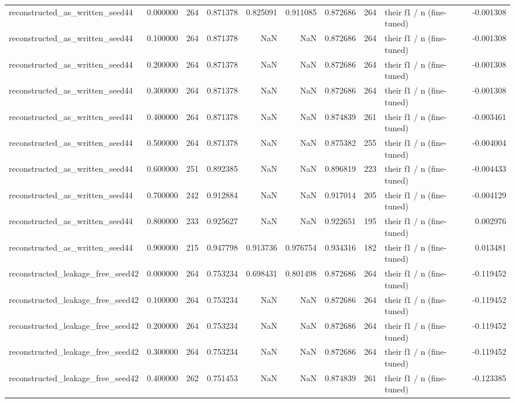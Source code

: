 \begin{tabular}{lrrrrrrrlr}
reconstructed_as_written_seed44 & 0.000000 & 264 & 0.871378 & 0.825091 & 0.911085 & 0.872686 & 264 & their f1 / n (fine-tuned) & -0.001308 \\
reconstructed_as_written_seed44 & 0.100000 & 264 & 0.871378 & NaN & NaN & 0.872686 & 264 & their f1 / n (fine-tuned) & -0.001308 \\
reconstructed_as_written_seed44 & 0.200000 & 264 & 0.871378 & NaN & NaN & 0.872686 & 264 & their f1 / n (fine-tuned) & -0.001308 \\
reconstructed_as_written_seed44 & 0.300000 & 264 & 0.871378 & NaN & NaN & 0.872686 & 264 & their f1 / n (fine-tuned) & -0.001308 \\
reconstructed_as_written_seed44 & 0.400000 & 264 & 0.871378 & NaN & NaN & 0.874839 & 261 & their f1 / n (fine-tuned) & -0.003461 \\
reconstructed_as_written_seed44 & 0.500000 & 264 & 0.871378 & NaN & NaN & 0.875382 & 255 & their f1 / n (fine-tuned) & -0.004004 \\
reconstructed_as_written_seed44 & 0.600000 & 251 & 0.892385 & NaN & NaN & 0.896819 & 223 & their f1 / n (fine-tuned) & -0.004433 \\
reconstructed_as_written_seed44 & 0.700000 & 242 & 0.912884 & NaN & NaN & 0.917014 & 205 & their f1 / n (fine-tuned) & -0.004129 \\
reconstructed_as_written_seed44 & 0.800000 & 233 & 0.925627 & NaN & NaN & 0.922651 & 195 & their f1 / n (fine-tuned) & 0.002976 \\
reconstructed_as_written_seed44 & 0.900000 & 215 & 0.947798 & 0.913736 & 0.976754 & 0.934316 & 182 & their f1 / n (fine-tuned) & 0.013481 \\
reconstructed_leakage_free_seed42 & 0.000000 & 264 & 0.753234 & 0.698431 & 0.801498 & 0.872686 & 264 & their f1 / n (fine-tuned) & -0.119452 \\
reconstructed_leakage_free_seed42 & 0.100000 & 264 & 0.753234 & NaN & NaN & 0.872686 & 264 & their f1 / n (fine-tuned) & -0.119452 \\
reconstructed_leakage_free_seed42 & 0.200000 & 264 & 0.753234 & NaN & NaN & 0.872686 & 264 & their f1 / n (fine-tuned) & -0.119452 \\
reconstructed_leakage_free_seed42 & 0.300000 & 264 & 0.753234 & NaN & NaN & 0.872686 & 264 & their f1 / n (fine-tuned) & -0.119452 \\
reconstructed_leakage_free_seed42 & 0.400000 & 262 & 0.751453 & NaN & NaN & 0.874839 & 261 & their f1 / n (fine-tuned) & -0.123385 \\

\end{tabular}
